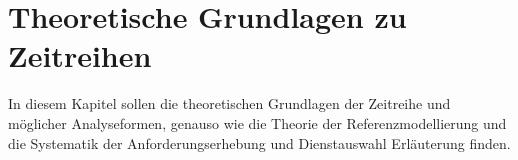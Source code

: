 \chapter{Theoretische Grundlagen zu Zeitreihen}\label{chapter:Theoretische-Grundlagen-zu-Zeitreihe}
In diesem Kapitel sollen die theoretischen Grundlagen der Zeitreihe und möglicher Analyseformen, genauso wie die Theorie der Referenzmodellierung und die Systematik der Anforderungserhebung und Dienstauswahl Erläuterung finden.









